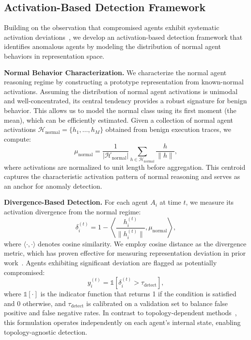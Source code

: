 \documentclass{article}
\theoremstyle{plain}
\theoremstyle{definition}
\theoremstyle{remark}
\begin{document}
\subsection{Activation-Based Detection Framework}
Building on the observation that compromised agents exhibit systematic
activation deviations~\cite{zhang2025jbshield,zhang2025controlling,tan2024revprag,jin2025internal}, 
we develop an activation-based detection framework that identifies anomalous 
agents by modeling the distribution of normal agent behaviors in 
representation space.

\noindent\textbf{Normal Behavior Characterization.}
We characterize the normal agent reasoning regime by constructing a prototype 
representation from known-normal activations.
Assuming the distribution of normal agent activations is unimodal and well-concentrated, its central tendency provides a robust signature for benign behavior. This allows us to model the normal class using its first moment (the mean), which can be efficiently estimated. Given a collection of normal agent 
activations $\mathcal{H}_{\text{normal}} = \{h_1, \ldots, h_M\}$ obtained 
from benign execution traces, we compute:
\begin{equation}
\mu_{\text{normal}} = \frac{1}{|\mathcal{H}_{\text{normal}}|}
\sum_{h \in \mathcal{H}_{\text{normal}}} \frac{h}{\|h\|},
\label{eq:prototype}
\end{equation}
where activations are normalized to unit length before aggregation.
This centroid captures the characteristic activation pattern of normal
reasoning and serves as an anchor for anomaly detection.

\noindent\textbf{Divergence-Based Detection.}
For each agent $A_i$ at time $t$, we measure its activation divergence from the
normal regime:
\begin{equation}
\delta_i^{(t)} = 1 -
\left\langle \frac{h_i^{(t)}}{\|h_i^{(t)}\|}, \mu_{\text{normal}} \right\rangle,
\label{eq:divergence}
\end{equation}
where $\langle \cdot, \cdot \rangle$ denotes cosine similarity.
We employ cosine distance as the divergence metric, which has proven effective 
for measuring representation deviation in prior 
work~\cite{reimers2019sentence}.
Agents exhibiting significant deviation are flagged as potentially compromised:
\begin{equation}
y_i^{(t)} = \mathbb{1}\!\left[\delta_i^{(t)} > \tau_{\text{detect}}\right],
\label{eq:detection}
\end{equation}
where $\mathbb{1}[\cdot]$ is the indicator function that returns 1 if the 
condition is satisfied and 0 otherwise, and $\tau_{\text{detect}}$ is calibrated on a validation set to balance false
positive and false negative rates.
In contrast to topology-dependent methods~\cite{wang2025g,miao2025blindguard},
this formulation operates independently on each agent's internal state,
enabling topology-agnostic detection.
\end{document}
